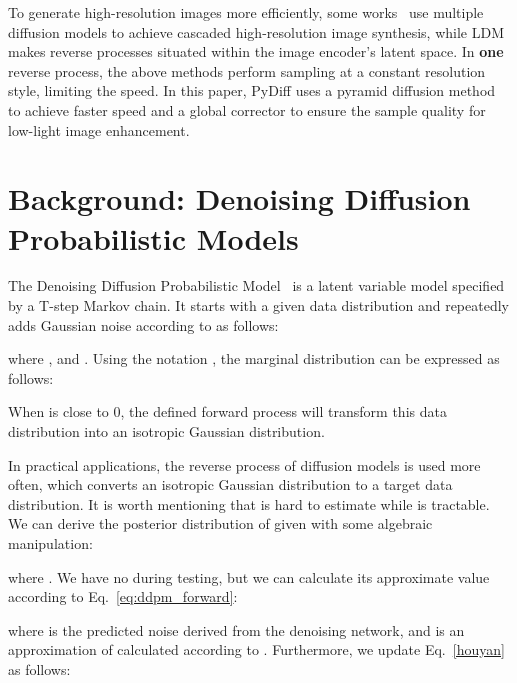 \documentclass{article}
\begin{document}
To generate high-resolution images more efficiently, some works~\cite{saharia2022image,ho2022cascaded,fan2022frido} use multiple diffusion models to achieve cascaded high-resolution image synthesis, while LDM~\cite{rombach2022high} makes reverse processes situated within the image encoder's latent space. In \textbf{one} reverse process, the above methods perform sampling at a constant resolution style, limiting the speed. In this paper, PyDiff uses a pyramid diffusion method to achieve faster speed and a global corrector to ensure the sample quality for low-light image enhancement.







\section{Background: Denoising Diffusion Probabilistic Models}



\label{background}
The Denoising Diffusion Probabilistic Model~\cite{ho2020denoising,song2020denoising} is a latent variable model specified by a T-step Markov chain. It starts with a given data distribution  and repeatedly adds Gaussian noise according to  as follows:

where , and .
Using the notation , the marginal distribution  can be expressed as follows:

When  is close to 0, the defined forward process will transform this data distribution into an isotropic Gaussian distribution.


In practical applications, the reverse process of diffusion models is used more often, which converts an isotropic Gaussian distribution to a target data distribution. It is worth mentioning that  is hard to estimate while  is tractable. We can derive the posterior distribution of  given  with some algebraic manipulation:
\begin{linenomath}

\end{linenomath}
where . 
We have no  during testing, but we can calculate its approximate value according to Eq.~\eqref{eq:ddpm_forward}:

where  is the predicted noise derived from the denoising network, and   is an approximation of  calculated according to . Furthermore, we update Eq.~\eqref{houyan} as follows:
\end{document}
